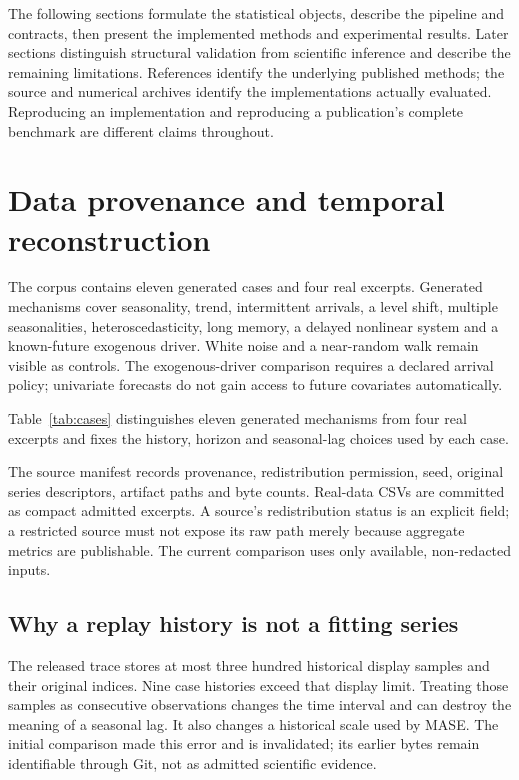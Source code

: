 \documentclass[11pt,a4paper]{article}
\begin{document}
The following sections formulate the statistical objects, describe the pipeline and contracts, then present the implemented methods and experimental results. Later sections distinguish structural validation from scientific inference and describe the remaining limitations. References identify the underlying published methods; the source and numerical archives identify the implementations actually evaluated. Reproducing an implementation and reproducing a publication's complete benchmark are different claims throughout.



\section{Data provenance and temporal reconstruction}
The corpus contains eleven generated cases and four real excerpts. Generated mechanisms cover seasonality, trend, intermittent arrivals, a level shift, multiple seasonalities, heteroscedasticity, long memory, a delayed nonlinear system and a known-future exogenous driver. White noise and a near-random walk remain visible as controls. The exogenous-driver comparison requires a declared arrival policy; univariate forecasts do not gain access to future covariates automatically.

Table~\ref{tab:cases} distinguishes eleven generated mechanisms from four real excerpts and fixes the history, horizon and seasonal-lag choices used by each case.


The source manifest records provenance, redistribution permission, seed, original series descriptors, artifact paths and byte counts. Real-data CSVs are committed as compact admitted excerpts. A source's redistribution status is an explicit field; a restricted source must not expose its raw path merely because aggregate metrics are publishable. The current comparison uses only available, non-redacted inputs.



\subsection{Why a replay history is not a fitting series}
The released trace stores at most three hundred historical display samples and their original indices. Nine case histories exceed that display limit. Treating those samples as consecutive observations changes the time interval and can destroy the meaning of a seasonal lag. It also changes a historical scale used by MASE. The initial comparison made this error and is invalidated; its earlier bytes remain identifiable through Git, not as admitted scientific evidence.
\end{document}
